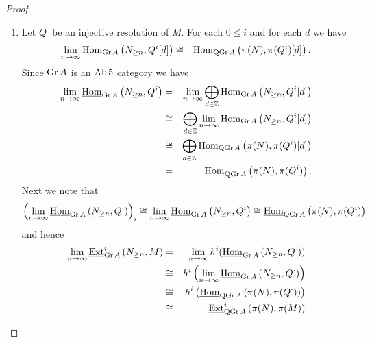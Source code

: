 \documentclass[dissertation.tex]{subfiles}
\begin{document}
\begin{prop}
  \begin{proof}
    \begin{enumerate}
    \item
      Let $Q^\cdot$ be an injective resolution of $M$.
      For each $0 \leq i$ and for each $d$ we have 
      \begin{eqnarray*}
        \lim_{n \rightarrow \infty}\operatorname{Hom}_{\operatorname{Gr}A}\left(N_{\geq n}, Q^i[d]\right) &\cong& 
        \operatorname{Hom}_{\operatorname{QGr}A}\left(\pi(N), \pi(Q^i)[d]\right).
      \end{eqnarray*}
      Since $\operatorname{Gr}A$ is an $\operatorname{Ab} 5$ category we have
      \begin{eqnarray*}
        \lim_{n \rightarrow \infty}\operatorname{\underline{Hom}}_{\operatorname{Gr}A}\left(N_{\geq n}, Q^i\right) &=&
        \lim_{n \rightarrow \infty}\bigoplus_{d \in \mathbb{Z}} \operatorname{Hom}_{\operatorname{Gr}A}\left(N_{\geq n}, Q^i[d]\right)\\
        &\cong& \bigoplus_{d \in \mathbb{Z}} \lim_{n \rightarrow \infty}\operatorname{Hom}_{\operatorname{Gr}A}\left(N_{\geq n}, Q^i[d]\right)\\
        &\cong& \bigoplus_{d \in \mathbb{Z}} \operatorname{Hom}_{\operatorname{QGr}A}\left(\pi(N), \pi(Q^i)[d]\right)\\
        &=&\operatorname{\underline{Hom}}_{\operatorname{QGr}A}\left(\pi(N), \pi(Q^i)\right).
      \end{eqnarray*}
      Next we note that
      $$\left(\lim_{n \rightarrow \infty} \operatorname{\underline{Hom}}_{\operatorname{Gr}A}\left(N_{\geq n}, Q^\cdot\right)\right)_i \cong \lim_{n \rightarrow \infty}\operatorname{\underline{Hom}}_{\operatorname{Gr}A}\left(N_{\geq n}, Q^i\right) \cong \operatorname{\underline{Hom}}_{\operatorname{QGr}A}\left(\pi(N), \pi(Q^i)\right)$$ and hence
      \begin{eqnarray*}
        \lim_{n \rightarrow \infty} \operatorname{\underline{Ext}}^{i}_{\operatorname{Gr}A}\left(N_{\geq n}, M\right) &=& 
        \lim_{n \rightarrow \infty} h^i(\operatorname{\underline{Hom}}_{\operatorname{Gr}A}\left(N_{\geq n}, Q^\cdot\right))\\
        &\cong& h^i\left(\lim_{n \rightarrow \infty} \operatorname{\underline{Hom}}_{\operatorname{Gr}A}\left(N_{\geq n}, Q^\cdot\right)\right)\\
        &\cong& h^i\left(\operatorname{\underline{Hom}}_{\operatorname{QGr}A}\left(\pi(N), \pi(Q^\cdot)\right)\right)\\
        &\cong& \operatorname{\underline{Ext}}^{i}_{\operatorname{QGr}A}\left(\pi(N), \pi(M)\right)
      \end{eqnarray*}

\end{enumerate}
\end{proof}
\end{prop}
\end{document}
